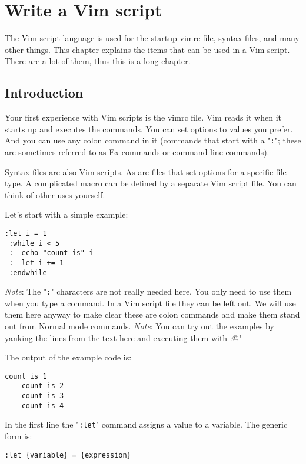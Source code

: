 \section{Write a Vim script}
\label{Write a Vim script}
The Vim script language is used for the startup vimrc file, syntax files, and many other things.
This chapter explains the items that can be used in a Vim script.
There are a lot of them, thus this is a long chapter.
\subsection{Introduction}
\label{vim-script-intro}
\label{script}
Your first experience with Vim scripts is the vimrc file.
Vim reads it when it starts up and executes the commands.
You can set options to values you prefer.
And you can use any colon command in it (commands that start with a "\verb!:!"; these are sometimes referred to as Ex commands or command-line commands).

Syntax files are also Vim scripts.
As are files that set options for a specific file type.
A complicated macro can be defined by a separate Vim script file.
You can think of other uses yourself.

Let's start with a simple example:

\begin{Verbatim}[samepage=true]
 :let i = 1
 :while i < 5
 :  echo "count is" i
 :  let i += 1
 :endwhile
\end{Verbatim}

\emph{Note}: The "\verb!:!" characters are not really needed here.
You only need to use them when you type a command.
In a Vim script file they can be left out.
We will use them here anyway to make clear these are colon commands and make them stand out from Normal mode commands.
\emph{Note}: You can try out the examples by yanking the lines from the text here and executing them with :@"

The output of the example code is:

\begin{Verbatim}[samepage=true]
    count is 1
    count is 2
    count is 3
    count is 4
\end{Verbatim}

In the first line the "\verb!:let!" command assigns a value to a variable.
The generic form is:

\begin{Verbatim}[samepage=true]
 :let {variable} = {expression}
\end{Verbatim}

